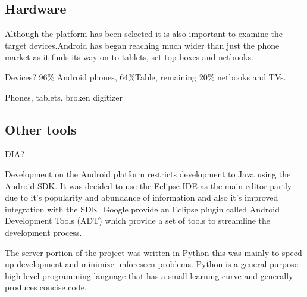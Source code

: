 \subsection{Hardware}
Although the platform has been selected it is also important to examine the target devices.Android has began reaching much wider than just the phone market as it finds its way on to tablets, set-top boxes and netbooks.

Devices? 96\% Android phones, 64\%Table, remaining 20\% netbooks and TVs.

Phones, tablets, broken digitizer

\subsection{Other tools}
DIA?

Development on the Android platform restricts development to Java using the Android SDK. It was decided to use the Eclipse IDE as the main editor partly due to it's popularity and abundance of information and also it's improved integration with the SDK. Google provide an Eclipse plugin called Android Development Tools (ADT) which provide a set of tools to streamline the development process. 



The server portion of the project was written in Python this was mainly to speed up development and minimize unforeseen problems. Python is a general purpose high-level programming language that has a small learning curve and generally produces concise code.